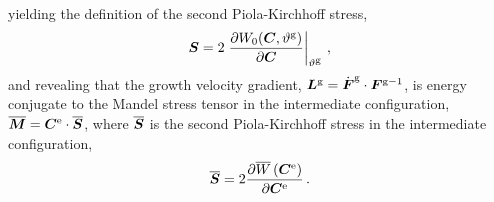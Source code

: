 \documentclass[10pt,letterpaper,oneside]{report}
\newcommand{\ten}[1]{\mbox{\boldmath $#1$}{}}
\newcommand{\scas}[1]{\mbox{{\scriptsize{${\rm{#1}}$}}}{}}
\begin{document}
\begin{itemize}
\begin{align}
\end{align}
yielding the definition of the second Piola-Kirchhoff stress,
\begin{equation}
\ten{S} = 2 \left. \frac{\partial W_0 ( \ten{C}, \vartheta^{\scas{g}}) }{\partial \ten{C}} \right|_{\vartheta^{\scas{g}}} \, ,
\label{SPK_ref}
\end{equation}
and revealing that the growth velocity gradient, $\ten{L}^{\scas{g}} = \dot{\ten{F}}^{\scas{g}} \cdot \ten{F}^{\scas{g}-1}$, is energy conjugate to the Mandel stress tensor in the intermediate configuration, $\overline{\ten{M}} = \ten{C}^{\scas{e}} \cdot \overline{\ten{S}} $, where $\overline{\ten{S}}$ is the second Piola-Kirchhoff stress in the intermediate configuration,
\begin{equation}
\overline{\ten{S}} = 2 \frac{ \partial \overline{W} \left( \ten{C}^{\scas{e}} \right) }{ \partial \ten{C}^{\scas{e}} } \, .
\label{SPK_int}
\end{equation}


\end{itemize}
\end{document}
